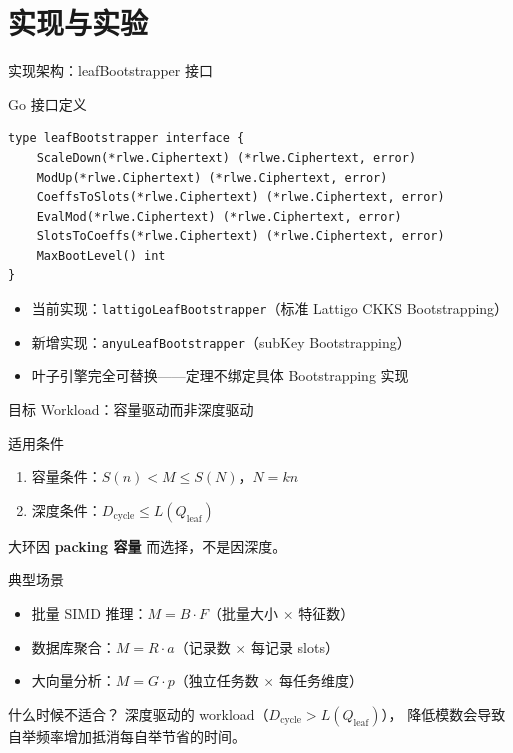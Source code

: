 \documentclass[aspectratio=169, 10pt, xcolor=svgnames, table, UTF8]{ctexbeamer}
\begin{document}
\section{实现与实验}

\begin{frame}[fragile]{实现架构：leafBootstrapper 接口}
  \begin{block}{Go 接口定义}
    \begin{verbatim}
type leafBootstrapper interface {
    ScaleDown(*rlwe.Ciphertext) (*rlwe.Ciphertext, error)
    ModUp(*rlwe.Ciphertext) (*rlwe.Ciphertext, error)
    CoeffsToSlots(*rlwe.Ciphertext) (*rlwe.Ciphertext, error)
    EvalMod(*rlwe.Ciphertext) (*rlwe.Ciphertext, error)
    SlotsToCoeffs(*rlwe.Ciphertext) (*rlwe.Ciphertext, error)
    MaxBootLevel() int
}
    \end{verbatim}
  \end{block}
  
  \pause
  
  \begin{itemize}
    \item 当前实现：\texttt{lattigoLeafBootstrapper}（标准 Lattigo CKKS Bootstrapping）
    \item 新增实现：\texttt{anyuLeafBootstrapper}（subKey Bootstrapping）
    \item 叶子引擎完全可替换——定理不绑定具体 Bootstrapping 实现
  \end{itemize}
\end{frame}

\begin{frame}{目标 Workload：容量驱动而非深度驱动}
  \begin{block}{适用条件}
    \begin{enumerate}
      \item 容量条件：\(S(n) < M \le S(N)\)，\(N = kn\)
      \item 深度条件：\(D_{\mathrm{cycle}} \le L(Q_{\mathrm{leaf}})\)
    \end{enumerate}
    大环因 \textbf{packing 容量} 而选择，不是因深度。
  \end{block}
  
  \pause
  
  \begin{exampleblock}{典型场景}
    \begin{itemize}
      \item 批量 SIMD 推理：\(M = B \cdot F\)（批量大小 \(\times\) 特征数）
      \item 数据库聚合：\(M = R \cdot a\)（记录数 \(\times\) 每记录 slots）
      \item 大向量分析：\(M = G \cdot p\)（独立任务数 \(\times\) 每任务维度）
    \end{itemize}
  \end{exampleblock}
  
  \pause
  
  \begin{alertblock}{什么时候不适合？}
    深度驱动的 workload（\(D_{\mathrm{cycle}} > L(Q_{\mathrm{leaf}})\)），
    降低模数会导致自举频率增加抵消每自举节省的时间。
  \end{alertblock}
\end{frame}
\end{document}
